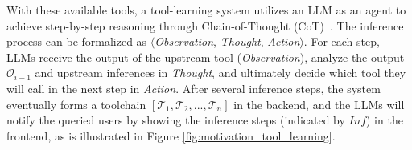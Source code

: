 {
With these available tools, a tool-learning system utilizes an LLM as an agent to achieve step-by-step reasoning through Chain-of-Thought (CoT)~\cite{DBLP:conf/iclr/YaoZYDSN023}.
The inference process can be formalized as $\langle$\textit{Observation}, \textit{Thought}, \textit{Action}$\rangle$.
For each step, LLMs receive the output of the upstream tool (\textit{Observation}), analyze the output $\mathcal{O}_{i-1}$ and upstream inferences in \textit{Thought}, and ultimately decide which tool they will call in the next step in \textit{Action}.
After several inference steps, the system eventually forms a toolchain $[\mathcal{T}_1,\mathcal{T}_2,...,\mathcal{T}_n]$ in the backend, and the LLMs will notify the queried users by showing the inference steps (indicated by $Inf$) in the frontend, as is illustrated in Figure \ref{fig:motivation_tool_learning}.
}


% 



